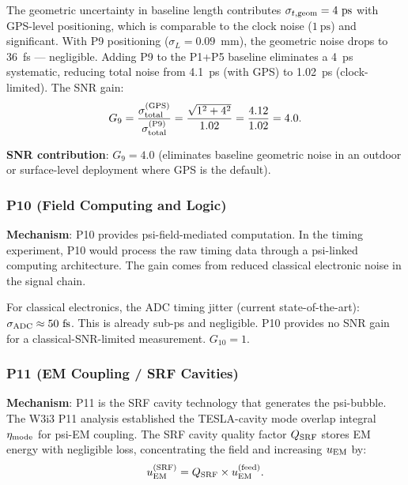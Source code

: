 \begin{proposition}
\label{prop:P9}
The geometric uncertainty in baseline length contributes $\sigma_{t,\rm geom}
= 4~\text{ps}$ with GPS-level positioning, which is comparable to the clock
noise ($1~\text{ps}$) and significant. With P9 positioning ($\sigma_L = 0.09$~mm),
the geometric noise drops to 36~fs --- negligible. Adding P9 to the P1+P5
baseline eliminates a 4~ps systematic, reducing total noise from 4.1~ps
(with GPS) to 1.02~ps (clock-limited). The SNR gain:
\begin{equation}
G_9 = \frac{\sigma_{\rm total}^{(\rm GPS)}}{\sigma_{\rm total}^{(\rm P9)}}
= \frac{\sqrt{1^2 + 4^2}}{1.02} = \frac{4.12}{1.02} = 4.0.
\label{eq:G9}
\end{equation}
\end{proposition}

\textbf{SNR contribution}: $G_9 = 4.0$ (eliminates baseline geometric noise
in an outdoor or surface-level deployment where GPS is the default).

\subsubsection*{P10 (Field Computing and Logic)}

\textbf{Mechanism}: P10 provides psi-field-mediated computation. In the timing
experiment, P10 would process the raw timing data through a psi-linked
computing architecture. The gain comes from reduced classical electronic noise
in the signal chain.

For classical electronics, the ADC timing jitter (current state-of-the-art):
$\sigma_{\rm ADC} \approx 50~\text{fs}$. This is already sub-ps and negligible.
P10 provides no SNR gain for a classical-SNR-limited measurement.
$G_{10} = 1$.

\subsubsection*{P11 (EM Coupling / SRF Cavities)}

\textbf{Mechanism}: P11 is the SRF cavity technology that generates the psi-bubble.
The W3i3 P11 analysis established the TESLA-cavity mode overlap integral
$\eta_{\rm mode}$ for psi-EM coupling. The SRF cavity quality factor $Q_{\rm SRF}$
stores EM energy with negligible loss, concentrating the field and
increasing $u_{\rm EM}$ by:
\begin{equation}
u_{\rm EM}^{(\rm SRF)} = Q_{\rm SRF} \times u_{\rm EM}^{(\rm feed)}.
\label{eq:SRF_energy}
\end{equation}

